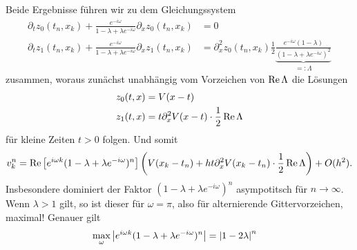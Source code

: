 Beide Ergebnisse führen wir zu dem Gleichungssystem
\begin{align}
\partial_t z_0(t_n, x_k) + \frac{e^{- i \omega}}{1 - \lambda + \lambda e^{-i \omega}} \partial_x z_0(t_n, x_k) &= 0\\
\partial_t z_1(t_n, x_k) + \frac{e^{- i \omega}}{1 - \lambda + \lambda e^{-i \omega}} \partial_x z_1(t_n, x_k)
&= \partial^2_x z_0(t_n, x_k) \frac{1}{2} \underbrace{\frac{ e^{-i \omega} (1- \lambda)}{(1 - \lambda + \lambda e^{-i \omega})^2}}_{=: \Lambda}
\end{align}
zusammen, woraus zunächst unabhängig vom Vorzeichen von $\operatorname{Re} \Lambda$ die Lösungen
\begin{align}
z_0(t,x) &= V(x - t)\\
z_1(t,x) &= t \partial^2_x V(x - t) \cdot \frac 12 \operatorname{Re} \Lambda
\end{align}
für kleine Zeiten $t > 0$ folgen. Und somit
\begin{align*}
v^n_k = \operatorname{Re} \left[ e^{i \omega k} (1 - \lambda + \lambda e^{-i \omega})^n \right] \left( V(x_k - t_n) + h t \partial^2_x V(x_k - t_n) \cdot \frac 12 \operatorname{Re} \Lambda \right) + O(h^2).
\end{align*}
Insbesondere dominiert der Faktor $(1 - \lambda + \lambda e^{-i \omega})^n$ asympotitsch für $n \to \infty$.
Wenn $\lambda > 1$ gilt, so ist dieser für $\omega = \pi$, also für alternierende Gittervorzeichen, maximal! Genauer gilt
\begin{align}
\max_\omega \left|  e^{i \omega k} (1 - \lambda + \lambda e^{-i \omega})^n  \right| &= \left| 1 - 2 \lambda \right|^n
\end{align}

